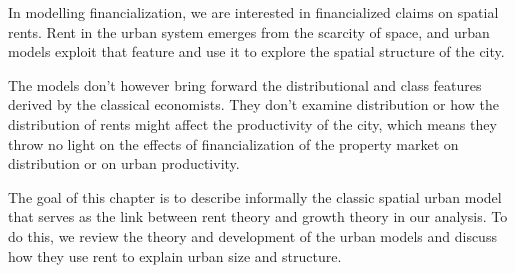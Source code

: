 



In modelling financialization, we are interested in financialized claims on spatial rents. 
Rent in the urban system emerges from the %
scarcity of space, and %
urban models exploit that feature and use it to explore the spatial structure of the city.

The models don't however bring forward the distributional and class features derived by the classical economists.  They don't examine distribution or how the distribution of rents might affect the productivity of the city, which means they throw no light on the effects of financialization of the property market on distribution or on urban productivity.

The goal of this chapter is to describe informally the classic spatial urban model that serves as the link between rent theory and growth theory in our analysis. %
To do this, we review the theory and development of the urban models and discuss how they %
use rent to explain urban size and structure. 

